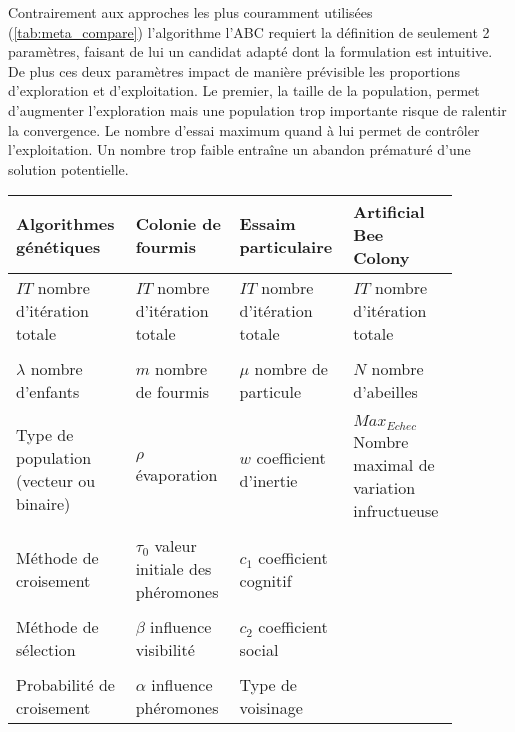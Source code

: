 Contrairement aux approches les plus couramment utilisées (\autoref{tab:meta_compare})
l’algorithme l’ABC requiert la définition de seulement 2 paramètres, faisant de lui un
candidat adapté dont la formulation est intuitive. De plus ces deux paramètres impact de
manière prévisible les proportions d’exploration et d’exploitation. Le premier, la taille
de la population, permet d’augmenter l’exploration mais une population trop importante
risque de ralentir la convergence. Le nombre d’essai maximum quand à lui permet de
contrôler l’exploitation. Un nombre trop faible entraîne un abandon prématuré d’une
solution potentielle.

\begin{table}
\centering
\small
\begin{tabular}{L{0.22\linewidth} L{0.22\linewidth} L{0.22\linewidth} L{0.22\linewidth}}
    \toprule
    \textbf{Algorithmes génétiques}          & \textbf{Colonie de fourmis}                &  \textbf{Essaim particulaire}   & \textbf{Artificial Bee Colony }                                 \\
    \midrule
    $IT$ nombre d’itération totale           & $IT$ nombre d’itération totale             & $IT$ nombre d’itération totale  & $IT$ nombre d’itération totale                          \\
    \\
    $\lambda$ nombre d’enfants               & $m$ nombre de fourmis                      & $\mu$ nombre de particule       & $N$ nombre d’abeilles                                   \\
    \\
    Type de population (vecteur ou binaire)  & $\rho$ évaporation                         & $w$ coefficient d’inertie       & $Max_{Echec}$ Nombre maximal de variation infructueuse  \\
    \\
    Méthode de croisement                    & $\tau_{0}$ valeur initiale des phéromones  & $c_{1}$ coefficient cognitif    &                                                         \\
    \\
    Méthode de sélection                     & $\beta$ influence visibilité               & $c_{2}$ coefficient social      &                                                         \\
    \\
    Probabilité de croisement                & $\alpha$ influence phéromones              & Type de voisinage               &                                                         \\

\end{tabular}
\end{table}
